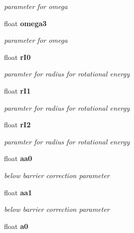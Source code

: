 \begin{CompactItemize}
\begin{CompactList}\small\item\em parameter for omega \item\end{CompactList}\item 
float \bf{omega3}\label{classCSigCharged_12c9f21352794c01bcc43bc2e4b5bb39}

\begin{CompactList}\small\item\em parameter for omega \item\end{CompactList}\item 
float \bf{r\-I0}\label{classCSigCharged_1d80ea773c32a209e2a59ff2127bd79e}

\begin{CompactList}\small\item\em paramter for radius for rotational energy \item\end{CompactList}\item 
float \bf{r\-I1}\label{classCSigCharged_b48b08d3862b74bfa5747269d6356a63}

\begin{CompactList}\small\item\em paramter for radius for rotational energy \item\end{CompactList}\item 
float \bf{r\-I2}\label{classCSigCharged_da18f138bed0f3c8c27f2afaa3fed991}

\begin{CompactList}\small\item\em paramter for radius for rotational energy \item\end{CompactList}\item 
float \bf{aa0}\label{classCSigCharged_6b8879bfcbd5795f59e61e6df5b5d8e6}

\begin{CompactList}\small\item\em below barrier correction parameter \item\end{CompactList}\item 
float \bf{aa1}\label{classCSigCharged_48b8b25cfb0231e40f94a00da13e3c85}

\begin{CompactList}\small\item\em below barrier correction parameter \item\end{CompactList}\item 
float \bf{a0}\label{classCSigCharged_19668087e1a2b0760639a42b9e141caf}


\end{CompactItemize}
